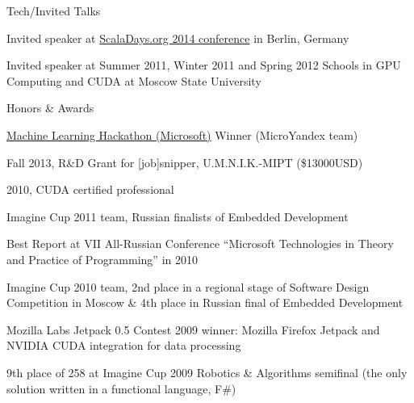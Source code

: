 \documentclass{resume} %
\begin{document}
\begin{rSubsectionSchools}{Tech/Invited Talks}
\item Invited speaker at \href{https://www.parleys.com/tutorial/meet-parboiled2-a-macro-based-peg-parser-generator-scala-2-10-3}{ScalaDays.org 2014 conference} in Berlin, Germany
\item Invited speaker at Summer 2011, Winter 2011 and Spring 2012 Schools in GPU Computing and CUDA at Moscow State University
\end{rSubsectionSchools}


\begin{rSubsectionSchools}{Honors \& Awards}
\item \href{https://events.techdays.ru/machine-learning/2015-11/}{Machine Learning Hackathon (Microsoft)} Winner (MicroYandex team)
\item Fall 2013, R\&D Grant for [job]snipper, U.M.N.I.K.-MIPT (\$13000USD)
\item 2010, CUDA certified professional
\item Imagine Cup 2011 team, Russian finalists of Embedded Development
\item Best Report at VII All-Russian Conference ``Microsoft Technologies in Theory and Practice of Programming'' in 2010
\item Imagine Cup 2010 team, 2nd place in a regional stage of Software Design Competition in Moscow \& 4th place in Russian final of Embedded Development
\item Mozilla Labs Jetpack 0.5 Contest 2009 winner: Mozilla Firefox Jetpack and NVIDIA CUDA integration for data processing
\item 9th place of 258 at Imagine Cup 2009 Robotics \& Algorithms semifinal (the only solution written in a functional language, F\#)
\end{rSubsectionSchools}

\end{document}
